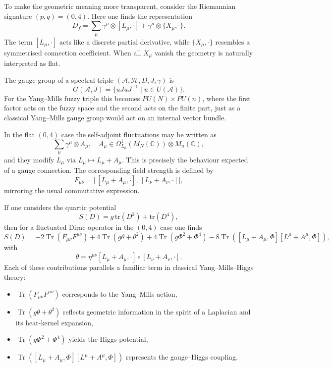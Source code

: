 \documentclass[11pt]{article}
\theoremstyle{plain}
\DeclareMathOperator{\tr}{Tr}
\begin{document}
\medskip


To make the geometric meaning more transparent, consider the Riemannian signature
$(p,q)=(0,4)$.  
Here one finds the representation
\[
D_f = \sum_\mu \gamma^\mu \otimes [L_\mu,\cdot]
+ \gamma^{\hat{\mu}} \otimes \{X_\mu,\cdot\}.
\]
The term $[L_\mu,\cdot]$ acts like a discrete partial derivative, while $\{X_\mu,\cdot\}$
resembles a symmetrised connection coefficient.  
When all $X_\mu$ vanish the geometry is naturally interpreted as flat.

The gauge group of a spectral triple $(\mathcal{A},\mathcal{H},D,J,\gamma)$ is
\[
G(\mathcal{A},J) = \{ uJuJ^{-1} \mid u \in U(\mathcal{A}) \}.
\]
For the Yang--Mills fuzzy triple this becomes $PU(N)\times PU(n)$, where the first factor
acts on the fuzzy space and the second acts on the finite part, just as a classical
Yang--Mills gauge group would act on an internal vector bundle.

In the flat $(0,4)$ case the self-adjoint fluctuations may be written as
\[
\sum_\mu \gamma^\mu \otimes A_\mu,
\quad
A_\mu \in \Omega^1_{L_\mu}(M_N(\mathbb{C})) \otimes M_n(\mathbb{C}),
\]
and they modify $L_\mu$ via $L_\mu \mapsto L_\mu + A_\mu$.  
This is precisely the behaviour expected of a gauge connection.  
The corresponding field strength is defined by
\[
F_{\mu\nu}
=
\big[\,[L_\mu + A_\mu,\cdot],\, [L_\nu + A_\nu,\cdot] \big],
\]
mirroring the usual commutative expression.

\medskip


If one considers the quartic potential
\[
S(D) = g\,\mathrm{tr}(D^2) + \mathrm{tr}(D^4),
\]
then for a fluctuated Dirac operator in the $(0,4)$ case one finds \cite{Sanchez Yang-Mills}
\[
S(D) =
-2\tr(F_{\mu\nu}F^{\mu\nu})
+ 4\tr(g\theta + \theta^2)
+ 4\tr(g\Phi^2 + \Phi^4)
- 8\tr([L_\mu+A_\mu,\Phi][L^\mu+A^\mu,\Phi]),
\]
with
\[
\theta = \eta^{\mu\nu}[L_\mu + A_\mu,\cdot]\circ [L_\nu + A_\nu,\cdot].
\]
Each of these contributions parallels a familiar term in classical Yang--Mills--Higgs
theory:
\begin{itemize}
\item $\tr(F_{\mu\nu}F^{\mu\nu})$ corresponds to the Yang--Mills action,
\item $\tr(g\theta + \theta^2)$ reflects geometric information in the spirit of a Laplacian and its heat-kernel expansion,
\item $\tr(g\Phi^2 + \Phi^4)$ yields the Higgs potential,
\item $\tr([L_\mu+A_\mu,\Phi][L^\mu+A^\mu,\Phi])$ represents the gauge--Higgs coupling.
\end{itemize}
\end{document}
